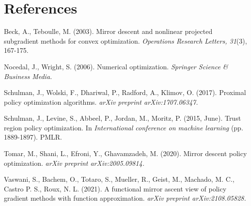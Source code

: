 \documentclass[a4paper, 10pt]{article}
\begin{document}
\section*{References}

\medskip
\small
\begin{list}{}{%
    \setlength{\topsep}{0pt}%
    \setlength{\leftmargin}{0.2in}%
    \setlength{\listparindent}{-0.2in}%
    \setlength{\itemindent}{-0.2in}%
    \setlength{\parsep}{\parskip}%
  }%

\item[] Beck, A., Teboulle, M. (2003). Mirror descent and nonlinear projected subgradient methods for convex optimization. \textit{Operations Research Letters, 31}(3), 167-175.

\item[] Nocedal, J., Wright, S. (2006). Numerical optimization. \textit{Springer Science \& Business Media.}

\item[] Schulman, J., Wolski, F., Dhariwal, P., Radford, A., Klimov, O. (2017). Proximal policy optimization algorithms. \textit{arXiv preprint arXiv:1707.06347.}

\item[] Schulman, J., Levine, S., Abbeel, P., Jordan, M., Moritz, P. (2015, June). Trust region policy optimization. In \textit{International conference on machine learning} (pp. 1889-1897). PMLR.

  \item[] Tomar, M., Shani, L., Efroni, Y., Ghavamzadeh, M. (2020). Mirror descent policy optimization. \textit{arXiv preprint arXiv:2005.09814.}
  
\item[] Vaswani, S., Bachem, O., Totaro, S., Mueller, R., Geist, M., Machado, M. C., Castro P. S., Roux, N. L. (2021). A functional mirror ascent view of policy gradient methods with function approximation. \textit{arXiv preprint arXiv:2108.05828.}
  
\end{list}
\end{document}
